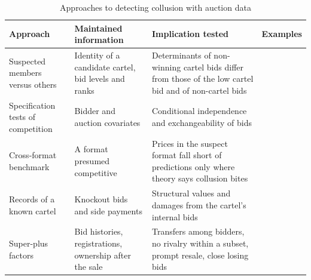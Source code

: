 \begin{table}[htbp]
\centering
\caption{Approaches to detecting collusion with auction data}
\label{tab:15-collusion-tests}
\footnotesize
\begin{tabularx}{\linewidth}{@{}>{\raggedright\arraybackslash}p{2.3cm}>{\raggedright\arraybackslash}X>{\raggedright\arraybackslash}X>{\raggedright\arraybackslash}p{2.6cm}@{}}
\toprule
Approach & Maintained information & Implication tested & Examples\\
\midrule
Suspected members versus others & Identity of a candidate cartel, bid levels and ranks & Determinants of
non-winning cartel bids differ from those of the low cartel bid and of non-cartel bids & \citet{PorterZona1993,PorterZona1999}\\
\addlinespace
Specification tests of competition & Bidder and auction covariates & Conditional independence and
exchangeability of bids & \citet{BajariYe2003}\\
\addlinespace
Cross-format benchmark & A format presumed competitive & Prices in the suspect format fall short of
predictions only where theory says collusion bites & \citet{AtheyLevinSeira2011}\\
\addlinespace
Records of a known cartel & Knockout bids and side payments & Structural values and damages from the
cartel's internal bids & \citet{Asker2010}\\
\addlinespace
Super-plus factors & Bid histories, registrations, ownership after the sale & Transfers among bidders, no
rivalry within a subset, prompt resale, close losing bids & \citet{MarshallMarx2012}\\
\bottomrule
\end{tabularx}
\end{table}

